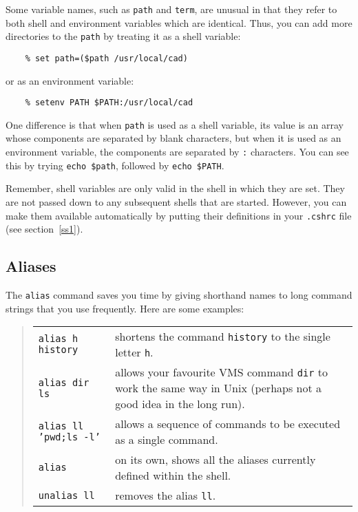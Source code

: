 Some variable names, such as {\tt path} and {\tt term}, are unusual in that
they refer to both shell and environment variables which are identical.
Thus, you can add more directories to the {\tt path} by treating it as a shell
variable:
\begin{verbatim}
    % set path=($path /usr/local/cad)
\end{verbatim}
or as an environment variable:
\begin{verbatim}
    % setenv PATH $PATH:/usr/local/cad
\end{verbatim}
One difference is that when {\tt path} is used as a shell variable, its value is
an array whose components are separated by blank characters, but when it is
used as an environment variable, the components are separated by {\tt :}
characters.
You can see this by trying {\tt echo \$path}, followed by {\tt echo \$PATH}.

Remember, shell variables are only valid in the shell in which they are set.
They are not passed down to any subsequent shells that are started.
However, you can make them available automatically by putting their definitions
in your {\tt .cshrc} file (see section~\ref{ss1}).

\subsection{Aliases}

The {\tt alias} command saves you time by giving shorthand names to long command
strings that you use frequently.
Here are some examples:
\begin{quote}
\begin{tabular}{lp{4.0in}}

{\tt alias h history} & shortens the command {\tt history} to the single letter
  {\tt h}.\\

{\tt  alias dir ls} & allows your favourite VMS command {\tt dir} to work the
   same way in Unix (perhaps not a good idea in the long run).\\

{\tt  alias ll 'pwd;ls -l'} & allows a sequence of commands to be executed as a
   single command.\\

{\tt  alias } & on its own, shows all the aliases currently defined within the
                shell.\\

{\tt  unalias ll} & removes the alias {\tt ll}.

\end{tabular}
\end{quote}

